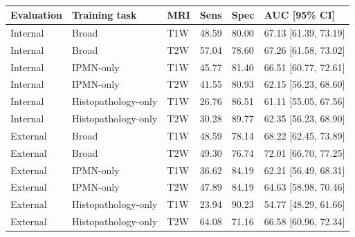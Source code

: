 \begin{table}[ht]
\centering
\caption{}
\label{tab:zw-frozen-pathology}
{\color{ZhixiangPink}\small
\begin{tabular}{llllll}
\toprule
Evaluation & Training task & MRI & Sens & Spec & AUC [95\% CI]\\
\midrule
Internal & Broad & T1W & 48.59 & 80.00 & 67.13 [61.39, 73.19]\\
Internal & Broad & T2W & 57.04 & 78.60 & 67.26 [61.58, 73.02]\\
Internal & IPMN-only & T1W & 45.77 & 81.40 & 66.51 [60.77, 72.61]\\
Internal & IPMN-only & T2W & 41.55 & 80.93 & 62.15 [56.23, 68.60]\\
Internal & Histopathology-only & T1W & 26.76 & 86.51 & 61.11 [55.05, 67.56]\\
Internal & Histopathology-only & T2W & 30.28 & 89.77 & 62.35 [56.23, 68.90]\\
External & Broad & T1W & 48.59 & 78.14 & 68.22 [62.45, 73.89]\\
External & Broad & T2W & 49.30 & 76.74 & 72.01 [66.70, 77.25]\\
External & IPMN-only & T1W & 36.62 & 84.19 & 62.21 [56.49, 68.31]\\
External & IPMN-only & T2W & 47.89 & 84.19 & 64.63 [58.98, 70.46]\\
External & Histopathology-only & T1W & 23.94 & 90.23 & 54.77 [48.29, 61.66]\\
External & Histopathology-only & T2W & 64.08 & 71.16 & 66.58 [60.96, 72.34]\\
\bottomrule
\end{tabular}}
\end{table}

